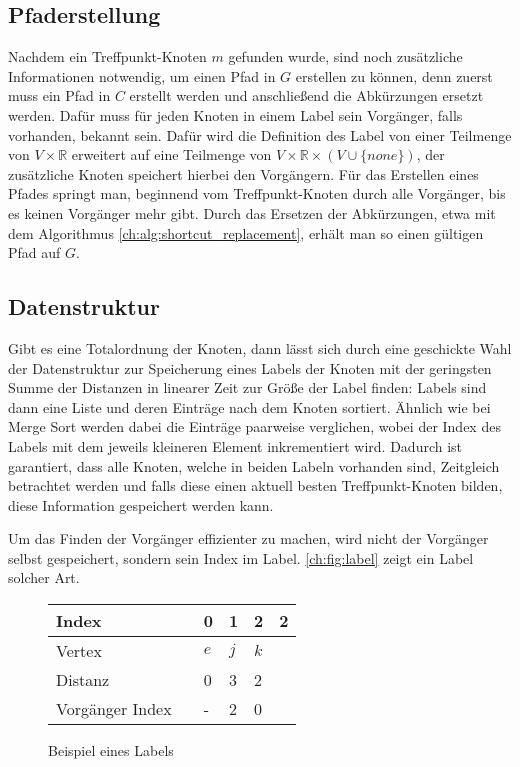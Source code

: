 \subsection{Pfaderstellung}

Nachdem ein Treffpunkt-Knoten $m$ gefunden wurde, sind noch zusätzliche Informationen notwendig, um einen Pfad in $G$ erstellen zu können, denn zuerst muss ein Pfad in $C$ erstellt werden und anschließend die Abkürzungen ersetzt werden.
Dafür muss für jeden Knoten in einem Label sein Vorgänger, falls vorhanden, bekannt sein.
Dafür wird die Definition des Label von einer Teilmenge von $V \times \mathbb{R}$ erweitert auf eine Teilmenge von $V \times \mathbb{R} \times (V \cup \{ none \}) $, der zusätzliche Knoten speichert hierbei den Vorgängern.
Für das Erstellen eines Pfades springt man, beginnend vom Treffpunkt-Knoten durch alle Vorgänger, bis es keinen Vorgänger mehr gibt.
Durch das Ersetzen der Abkürzungen, etwa mit dem Algorithmus \ref{ch:alg:shortcut_replacement}, erhält man so einen gültigen Pfad auf $G$.

\subsection{Datenstruktur}

Gibt es eine Totalordnung der Knoten, dann lässt sich durch eine geschickte Wahl der Datenstruktur zur Speicherung eines Labels der Knoten mit der geringsten Summe der Distanzen in linearer Zeit zur Größe der Label finden:
Labels sind dann eine Liste und deren Einträge nach dem Knoten sortiert.
Ähnlich wie bei Merge Sort werden dabei die Einträge paarweise verglichen, wobei der Index des Labels mit dem jeweils kleineren Element inkrementiert wird.
Dadurch ist garantiert, dass alle Knoten, welche in beiden Labeln vorhanden sind, Zeitgleich betrachtet werden und falls diese einen aktuell besten Treffpunkt-Knoten bilden, diese Information gespeichert werden kann.

Um das Finden der Vorgänger effizienter zu machen, wird nicht der Vorgänger selbst gespeichert, sondern sein Index im Label.
\autoref{ch:fig:label} zeigt ein Label solcher Art.

\begin{figure}[ht]
  \centering
  \begin{tabular}{@{}llllll@{}}
    \toprule
    Index           &  & 0   & 1   & 2   & 2 \\ \midrule
    Vertex          &  & $e$ & $j$ & $k$ &   \\
    Distanz         &  & 0   & 3   & 2   &   \\
    Vorgänger Index &  & -   & 2   & 0   &   \\ \bottomrule
  \end{tabular}
  \caption{Beispiel eines Labels}
  \label{ch:fig:label}
\end{figure}

